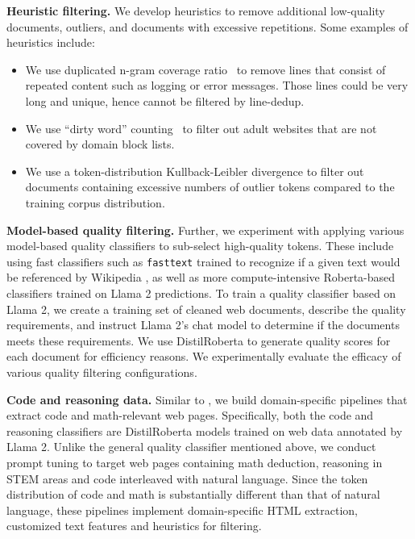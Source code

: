 \documentclass[dvipsnames]{fairmeta}
\begin{document}
\textbf{Heuristic filtering.}
We develop heuristics to remove additional low-quality documents, outliers, and documents with excessive repetitions. Some examples of heuristics include:
\begin{itemize}
\item We use duplicated n-gram coverage ratio~\citep{Rae2021ScalingLM} to remove lines that consist of repeated content such as logging or error messages. Those lines could be very long and unique, hence cannot be filtered by line-dedup. 
\item We use ``dirty word'' counting~\citep{raffel2020exploring} to filter out adult websites that are not covered by domain block lists.
\item We use a token-distribution Kullback-Leibler divergence to filter out documents containing excessive numbers of outlier tokens compared to the training corpus distribution.
\end{itemize}

\textbf{Model-based quality filtering.}
Further, we experiment with applying various model-based quality classifiers to sub-select high-quality tokens. These include using fast classifiers such as \texttt{fasttext} \citep{joulin2017bag} trained to recognize if a given text would be referenced by Wikipedia \citep{touvron2023llama}, as well as more compute-intensive Roberta-based classifiers \citep{liu2019roberta} trained on Llama 2 predictions.
To train a quality classifier based on Llama 2, we create a training set of cleaned web documents, describe the quality requirements, and instruct Llama 2's chat model to determine if the documents meets these requirements. 
We use DistilRoberta \citep{sanh2019distilbert} to generate quality scores for each document for efficiency reasons.
We experimentally evaluate the efficacy of various quality filtering configurations.

\textbf{Code and reasoning data.}
Similar to \citet{deepseekai2024deepseekcoderv2breakingbarrierclosedsource}, we build domain-specific pipelines that extract code and math-relevant web pages. 
Specifically, both the code and reasoning classifiers are DistilRoberta models trained on web data annotated by Llama 2. 
Unlike the general quality classifier mentioned above, we conduct prompt tuning to target web pages containing math deduction, reasoning in STEM areas and code interleaved with natural language. 
Since the token distribution of code and math is substantially different than that of natural language, these pipelines implement domain-specific HTML extraction, customized text features and heuristics for filtering.
\end{document}
